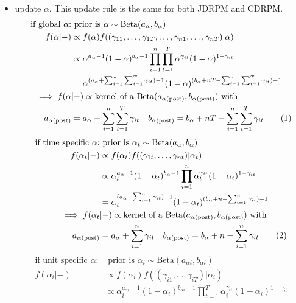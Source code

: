 \documentclass[12pt,	%
	a4paper,		%
	twoside,		%
	openright,		%
	titlepage,%
	]{book}
\theoremstyle{definition}
\begin{document}
\begin{itemize}
\item update $\alpha$. This update rule is the same for both JDRPM and CDRPM.
\begin{align*}
    \text{if global $\alpha$:} & \text{ prior is $\alpha \sim \text{Beta}(a_\alpha, b_\alpha)$}\\
    f(\alpha|-) & \propto f(\alpha) f((\gamma_{11}, \ldots,\gamma_{1T}, \ldots, \gamma_{n1}, \ldots, \gamma_{nT})|\alpha)\\
    & \propto \alpha^{a_\alpha-1}(1-\alpha)^{b_\alpha-1} \prod_{i=1}^n \prod_{t=1}^T \alpha^{\gamma_{it}}(1-\alpha)^{1-\gamma_{it}}\\
    & = \alpha^{(a_\alpha+\sum_{i=1}^n \sum_{t=1}^T \gamma_{it})-1} (1-\alpha)^{(b_\alpha+nT-\sum_{i=1}^n \sum_{t=1}^T \gamma_{it})-1}\\
    \implies f(\alpha&|-)\propto \text{kernel of a $\Beta(a_{\postp{\alpha}},b_{\postp{\alpha}})$ with}\\
    a_{\postp{\alpha}} &= a_\alpha+\sum_{i=1}^n \sum_{t=1}^T \gamma_{it} \quad
    b_{\postp{\alpha}} = b_\alpha+nT-\sum_{i=1}^n \sum_{t=1}^T \gamma_{it}
\tag{\stepcounter{equation}\theequation}
\end{align*}
\begin{align*}
    \text{if time specific $\alpha$:} & \text{ prior is $\alpha_t \sim \text{Beta}(a_\alpha, b_\alpha)$}\\
    f(\alpha_t|-) & \propto f(\alpha_t) f((\gamma_{1t}, \ldots, \gamma_{nt})|\alpha_t)\\
    & \propto \alpha_t^{a_\alpha-1}(1-\alpha_t)^{b_\alpha-1} \prod_{i=1}^n \alpha_t^{\gamma_{it}}(1-\alpha_t)^{1-\gamma_{it}}\\
    & = \alpha_t^{(a_\alpha+\sum_{i=1}^n \gamma_{it})-1} (1-\alpha_t)^{(b_\alpha+n-\sum_{i=1}^n \gamma_{it})-1}\\
    \implies f(\alpha_t&|-)\propto \text{kernel of a $\Beta(a_{\postp{\alpha}},b_{\postp{\alpha}})$ with}\\
    a_{\postp{\alpha}} &= a_\alpha+\sum_{i=1}^n \gamma_{it} \quad
    b_{\postp{\alpha}} = b_\alpha+n-\sum_{i=1}^n \gamma_{it}
\tag{\stepcounter{equation}\theequation}
\end{align*}
\begin{align*}
    \text{if unit specific $\alpha$:}& \text{ prior is $\alpha_{i} \sim \text{Beta}(a_{\alpha i}, b_{\alpha i})$}\\
    f(\alpha_{i}|-) & \propto f(\alpha_{i}) f((\gamma_{i1}, \ldots, \gamma_{iT})|\alpha_{i})\\
    & \propto \alpha_{i}^{a_{\alpha i}-1}(1-\alpha_{i})^{b_{\alpha i}-1} \prod_{t=1}^T \alpha_i^{\gamma_{it}}(1-\alpha_i)^{1-\gamma_{it}}\\

\end{align*}
\end{itemize}
\end{document}
